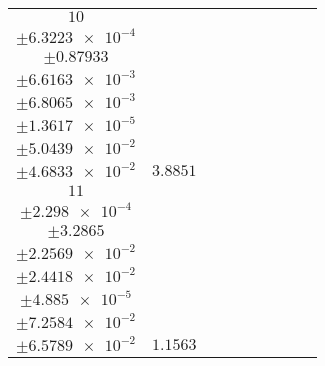 \documentclass[8pt]{article}
\begin{document}
\begin{longtable}[l]{c c c c c c c c c}
$\num{10}$ & \begin{tabular}[c]{@{}c@{}}$\num{3.0201e-2}$ \\ $\pm\num{6.3223e-4}$\end{tabular} & \begin{tabular}[c]{@{}c@{}}$\num{-0.72943}$ \\ $\pm\num{0.87933}$\end{tabular} & \begin{tabular}[c]{@{}c@{}}$\num{3.7149}$ \\ $\pm\num{6.6163e-3}$\end{tabular} & \begin{tabular}[c]{@{}c@{}}$\num{1.5782e+3}$ \\ $\pm\num{6.8065e-3}$\end{tabular} & \begin{tabular}[c]{@{}c@{}}$\num{3.1573}$ \\ $\pm\num{1.3617e-5}$\end{tabular} & \begin{tabular}[c]{@{}c@{}}$\num{4.2931}$ \\ $\pm\num{5.0439e-2}$\end{tabular} & \begin{tabular}[c]{@{}c@{}}$\num{4.1882}$ \\ $\pm\num{4.6833e-2}$\end{tabular} & $\num{3.8851}$\\
$\num{11}$ & \begin{tabular}[c]{@{}c@{}}$\num{8.4597e-3}$ \\ $\pm\num{2.298e-4}$\end{tabular} & \begin{tabular}[c]{@{}c@{}}$\num{-0.82182}$ \\ $\pm\num{3.2865}$\end{tabular} & \begin{tabular}[c]{@{}c@{}}$\num{5.4736}$ \\ $\pm\num{2.2569e-2}$\end{tabular} & \begin{tabular}[c]{@{}c@{}}$\num{1.5799e+3}$ \\ $\pm\num{2.4418e-2}$\end{tabular} & \begin{tabular}[c]{@{}c@{}}$\num{3.1608}$ \\ $\pm\num{4.885e-5}$\end{tabular} & \begin{tabular}[c]{@{}c@{}}$\num{3.528}$ \\ $\pm\num{7.2584e-2}$\end{tabular} & \begin{tabular}[c]{@{}c@{}}$\num{3.3619}$ \\ $\pm\num{6.5789e-2}$\end{tabular} & $\num{1.1563}$\\

\end{longtable}
\end{document}
